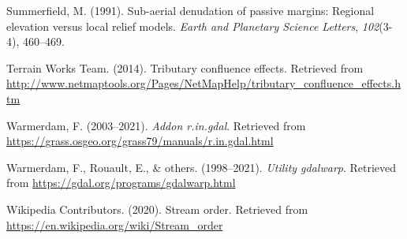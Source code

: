 \documentclass[11pt,]{article}
\begin{document}
\hypertarget{ref-summerfield1991sub}{}
Summerfield, M. (1991). Sub-aerial denudation of passive margins:
Regional elevation versus local relief models. \emph{Earth and Planetary
Science Letters}, \emph{102}(3-4), 460--469.

\hypertarget{ref-tributary}{}
Terrain Works Team. (2014). Tributary confluence effects. Retrieved from
\url{http://www.netmaptools.org/Pages/NetMapHelp/tributary_confluence_effects.htm}

\hypertarget{ref-ringdal}{}
Warmerdam, F. (2003--2021). \emph{Addon r.in.gdal}. Retrieved from
\url{https://grass.osgeo.org/grass79/manuals/r.in.gdal.html}

\hypertarget{ref-gdalwarp}{}
Warmerdam, F., Rouault, E., \& others. (1998--2021). \emph{Utility
gdalwarp}. Retrieved from \url{https://gdal.org/programs/gdalwarp.html}

\hypertarget{ref-wikipedia2020stream}{}
Wikipedia Contributors. (2020). Stream order. Retrieved from
\url{https://en.wikipedia.org/wiki/Stream_order}




\newpage
\singlespacing 
\end{document}
